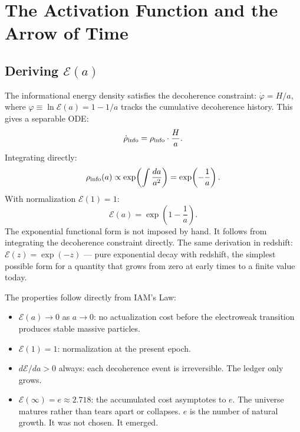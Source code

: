 \documentclass[12pt,a4paper]{article}
\begin{document}
\newpage

\section{The Activation Function and the Arrow of Time}
\label{sec:activation}

\subsection{Deriving $\mathcal{E}(a)$}

The informational energy density satisfies the decoherence constraint:
$\dot\varphi = H/a$, where $\varphi \equiv \ln\mathcal{E}(a) = 1 - 1/a$ tracks
the cumulative decoherence history. This gives a separable ODE:
\begin{equation}
\dot{\rho}_{\rm info} = \rho_{\rm info}\cdot\frac{H}{a}.
\end{equation}
Integrating directly:
\begin{equation}
\rho_{\rm info}(a) \propto
\exp\!\left(\int \frac{da}{a^2}\right) = \exp\!\left(-\frac{1}{a}\right).
\end{equation}
With normalization $\mathcal{E}(1) = 1$:
\begin{equation}
\boxed{\mathcal{E}(a) = \exp\!\left(1 - \frac{1}{a}\right).}
\label{eq:Ea}
\end{equation}
The exponential functional form is not imposed by hand. It follows from
integrating the decoherence constraint directly. The same derivation in redshift:
$\mathcal{E}(z) = \exp(-z)$ --- pure exponential decay with redshift, the
simplest possible form for a quantity that grows from zero at early times to
a finite value today.

The properties follow directly from IAM's Law:
\begin{itemize}[leftmargin=1.5em]
\item $\mathcal{E}(a) \to 0$ as $a \to 0$: no actualization cost before
  the electroweak transition produces stable massive particles.
\item $\mathcal{E}(1) = 1$: normalization at the present epoch.
\item $d\mathcal{E}/da > 0$ always: each decoherence event is irreversible.
  The ledger only grows.
\item $\mathcal{E}(\infty) = e \approx 2.718$: the accumulated cost asymptotes
  to $e$. The universe matures rather than tears apart or collapses.
  $e$ is the number of natural growth. It was not chosen. It emerged.
\end{itemize}
\end{document}
